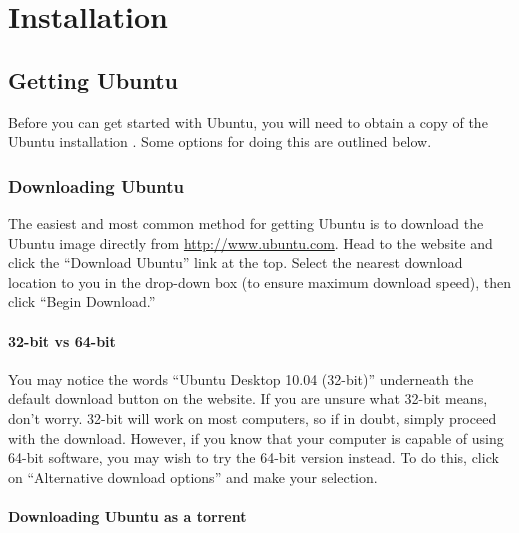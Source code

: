 
\chapter{Installation}
\label{ch:installation}

\section{Getting Ubuntu}
Before you can get started with Ubuntu, you will need to obtain a copy of the Ubuntu installation . Some options for doing this are outlined below.

\subsection{Downloading Ubuntu}
The easiest and most common method for getting Ubuntu is to download the Ubuntu  image directly from \url{http://www.ubuntu.com}. Head to the website and click the ``Download Ubuntu'' link at the top. Select the nearest download location to you in the drop-down box (to ensure maximum download speed), then click ``Begin Download.''

\subsubsection{32-bit vs 64-bit}
You may notice the words ``Ubuntu Desktop 10.04 (32-bit)'' underneath the default download button on the website. If you are unsure what 32-bit means, don't worry. 32-bit will work on most computers, so if in doubt, simply proceed with the download. However, if you know that your computer is capable of using 64-bit software, you may wish to try the 64-bit version instead. To do this, click on ``Alternative download options'' and make your selection.


\subsubsection{Downloading Ubuntu as a torrent} 

